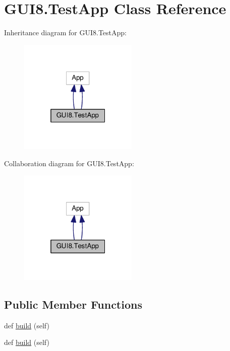 \hypertarget{classGUI8_1_1TestApp}{}\section{G\+U\+I8.\+Test\+App Class Reference}
\label{classGUI8_1_1TestApp}


Inheritance diagram for G\+U\+I8.\+Test\+App\+:
\nopagebreak
\begin{figure}[H]
\begin{center}
\leavevmode
\includegraphics[width=160pt]{classGUI8_1_1TestApp__inherit__graph}
\end{center}
\end{figure}


Collaboration diagram for G\+U\+I8.\+Test\+App\+:
\nopagebreak
\begin{figure}[H]
\begin{center}
\leavevmode
\includegraphics[width=160pt]{classGUI8_1_1TestApp__coll__graph}
\end{center}
\end{figure}
\subsection*{Public Member Functions}
\begin{DoxyCompactItemize}
\item 
def \hyperlink{classGUI8_1_1TestApp_a664816e2a2642c5904acc8826e07e0a8}{build} (self)
\item 
def \hyperlink{classGUI8_1_1TestApp_a664816e2a2642c5904acc8826e07e0a8}{build} (self)
\end{DoxyCompactItemize}
